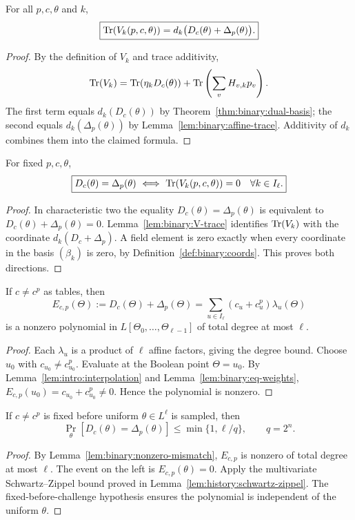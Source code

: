 \begin{lemma}\label{lem:binary:V-trace}
For all $p,c,\theta$ and $k$,
\[
 \boxed{\operatorname{Tr}(V_k(p,c,\theta))
      =d_k\bigl(D_c(\theta)+\Delta_p(\theta)\bigr).}
\]
\end{lemma}
\begin{proof}
By the definition of $V_k$ and trace additivity,
\[
 \operatorname{Tr}(V_k)=\operatorname{Tr}(\eta_k D_c(\theta))
  +\operatorname{Tr}\left(\sum_vH_{v,k}p_v\right).
\]
The first term equals $d_k(D_c(\theta))$ by
Theorem~\ref{thm:binary:dual-basis}; the second equals
$d_k(\Delta_p(\theta))$ by
Lemma~\ref{lem:binary:affine-trace}.
Additivity of $d_k$ combines them into the claimed formula.
\end{proof}

\begin{theorem}\label{thm:binary:affine-consistency}
For fixed $p,c,\theta$,
\[
 \boxed{
 D_c(\theta)=\Delta_p(\theta)
 \ \Longleftrightarrow\
 \operatorname{Tr}(V_k(p,c,\theta))=0\quad\forall k\in I_\ell.
 }
\]
\end{theorem}
\begin{proof}
In characteristic two the equality
$D_c(\theta)=\Delta_p(\theta)$ is equivalent to
$D_c(\theta)+\Delta_p(\theta)=0$.
Lemma~\ref{lem:binary:V-trace} identifies
$\operatorname{Tr}(V_k)$ with the coordinate
$d_k(D_c+\Delta_p)$. A field element is zero exactly
when every coordinate in the basis $(\beta_k)$ is zero,
by Definition~\ref{def:binary:coords}. This proves both directions.
\end{proof}

\begin{lemma}\label{lem:binary:nonzero-mismatch}
If $c\neq c^p$ as tables, then
\[
 E_{c,p}(\Theta):=D_c(\Theta)+\Delta_p(\Theta)
   =\sum_{u\in I_\ell}(c_u+c^p_u)\lambda_u(\Theta)
\]
is a nonzero polynomial in $L[\Theta_0,\ldots,\Theta_{\ell-1}]$
of total degree at most $\ell$.
\end{lemma}
\begin{proof}
Each $\lambda_u$ is a product of $\ell$ affine factors,
giving the degree bound. Choose $u_0$ with
$c_{u_0}\neq c^p_{u_0}$.
Evaluate at the Boolean point $\Theta=u_0$. By
Lemma~\ref{lem:intro:interpolation} and
Lemma~\ref{lem:binary:eq-weights},
$E_{c,p}(u_0)=c_{u_0}+c^p_{u_0}\neq0$.
Hence the polynomial is nonzero.
\end{proof}

\begin{corollary}\label{cor:binary:mismatch-bound}
If $c\neq c^p$ is fixed before uniform
$\theta\in L^\ell$ is sampled, then
\[
 \Pr_\theta[D_c(\theta)=\Delta_p(\theta)]
 \leq \min\{1,\ell/q\},\qquad q=2^n.
\]
\end{corollary}
\begin{proof}
By Lemma~\ref{lem:binary:nonzero-mismatch},
$E_{c,p}$ is nonzero of total degree at most $\ell$.
The event on the left is $E_{c,p}(\theta)=0$.
Apply the multivariate Schwartz--Zippel bound proved in
Lemma~\ref{lem:history:schwartz-zippel}.
The fixed-before-challenge hypothesis ensures the
polynomial is independent of the uniform $\theta$.
\end{proof}


